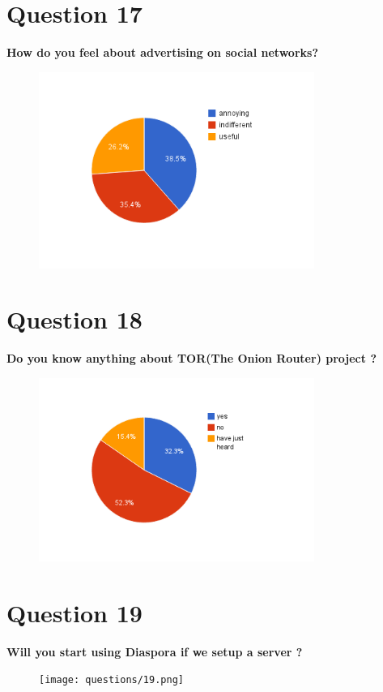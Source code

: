 \documentclass[11pt]{book}
\begin{document}
\newpage
\chapter{Question 17}
\textbf{How do you feel about advertising on social networks?
}
\begin{figure}[ht!]
	\centering
	\includegraphics[width=90mm]{questions/17.png}
	\label{overflow}
\end{figure}

\newpage
\chapter{Question 18}
\textbf{Do you know anything about TOR(The Onion Router) project ?
}
\begin{figure}[ht!]
	\centering
	\includegraphics[width=90mm]{questions/18.png}
	\label{overflow}
\end{figure}

\newpage
\chapter{Question 19}
\textbf{Will you start using Diaspora if we setup a server ?}
\begin{figure}[ht!]
	\centering
	\texttt{[image: questions/19.png]}
	\label{overflow}
\end{figure}
\end{document}
